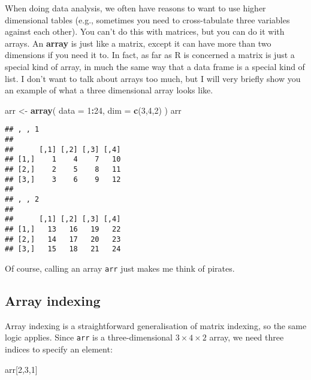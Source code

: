 \documentclass[]{book}
\newenvironment{Shaded}{\begin{snugshade}}{\end{snugshade}}
\newcommand{\DataTypeTok}[1]{\textcolor[rgb]{0.13,0.29,0.53}{#1}}
\newcommand{\DecValTok}[1]{\textcolor[rgb]{0.00,0.00,0.81}{#1}}
\newcommand{\KeywordTok}[1]{\textcolor[rgb]{0.13,0.29,0.53}{\textbf{#1}}}
\newcommand{\NormalTok}[1]{#1}
\newcommand{\OperatorTok}[1]{\textcolor[rgb]{0.81,0.36,0.00}{\textbf{#1}}}
\newcommand{\StringTok}[1]{\textcolor[rgb]{0.31,0.60,0.02}{#1}}
\begin{document}
When doing data analysis, we often have reasons to want to use higher dimensional tables (e.g., sometimes you need to cross-tabulate three variables against each other). You can't do this with matrices, but you can do it with arrays. An \textbf{array} is just like a matrix, except it can have more than two dimensions if you need it to. In fact, as far as R is concerned a matrix is just a special kind of array, in much the same way that a data frame is a special kind of list. I don't want to talk about arrays too much, but I will very briefly show you an example of what a three dimensional array looks like.

\begin{Shaded}
\begin{Highlighting}[]
\NormalTok{arr <-}\StringTok{ }\KeywordTok{array}\NormalTok{(}
  \DataTypeTok{data =} \DecValTok{1}\OperatorTok{:}\DecValTok{24}\NormalTok{, }
  \DataTypeTok{dim =} \KeywordTok{c}\NormalTok{(}\DecValTok{3}\NormalTok{,}\DecValTok{4}\NormalTok{,}\DecValTok{2}\NormalTok{)}
\NormalTok{  )}
\NormalTok{arr}
\end{Highlighting}
\end{Shaded}

\begin{verbatim}
## , , 1
## 
##      [,1] [,2] [,3] [,4]
## [1,]    1    4    7   10
## [2,]    2    5    8   11
## [3,]    3    6    9   12
## 
## , , 2
## 
##      [,1] [,2] [,3] [,4]
## [1,]   13   16   19   22
## [2,]   14   17   20   23
## [3,]   15   18   21   24
\end{verbatim}

Of course, calling an array \texttt{arr} just makes me think of pirates.

\hypertarget{array-indexing}{%
\subsection{Array indexing}\label{array-indexing}}

Array indexing is a straightforward generalisation of matrix indexing, so the same logic applies. Since \texttt{arr} is a three-dimensional \(3 \times 4 \times 2\) array, we need three indices to specify an element:

\begin{Shaded}
\begin{Highlighting}[]
\NormalTok{arr[}\DecValTok{2}\NormalTok{,}\DecValTok{3}\NormalTok{,}\DecValTok{1}\NormalTok{]}
\end{Highlighting}
\end{Shaded}
\end{document}

